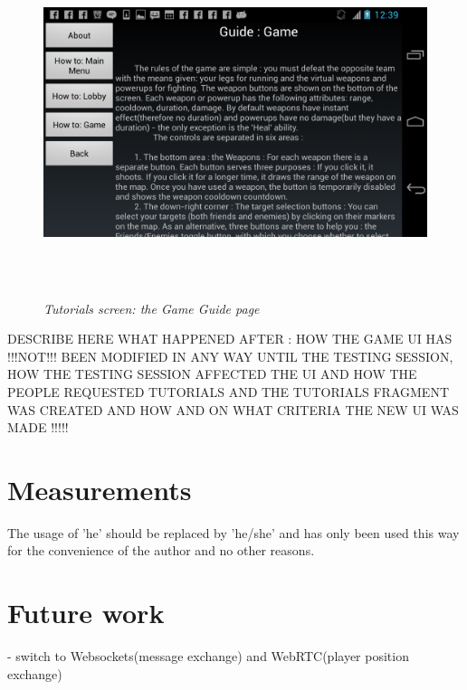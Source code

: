 \documentclass{article}
\begin{document}
\begin{figure}
\includegraphics[height=4in,width=7.12in]{./images/android_screenshots/tutorial_fragment_2.png}
\caption{\small \sl Tutorials screen: the Game Guide page
\label{fig:tutorial_fragment2}}
\end{figure}




DESCRIBE HERE WHAT HAPPENED AFTER : HOW THE GAME UI HAS !!!NOT!!! BEEN MODIFIED
IN ANY WAY UNTIL THE TESTING SESSION, HOW THE TESTING SESSION AFFECTED THE UI
AND HOW THE PEOPLE REQUESTED TUTORIALS AND THE TUTORIALS FRAGMENT WAS CREATED
AND HOW AND ON WHAT CRITERIA THE NEW UI WAS MADE !!!!!









\section{Measurements}


The usage of 'he' should be replaced by 'he/she' and has only been used this way
for the convenience of the author and no other reasons.




\section{Future work}

- switch to Websockets(message exchange) and WebRTC(player position exchange)
\end{document}
